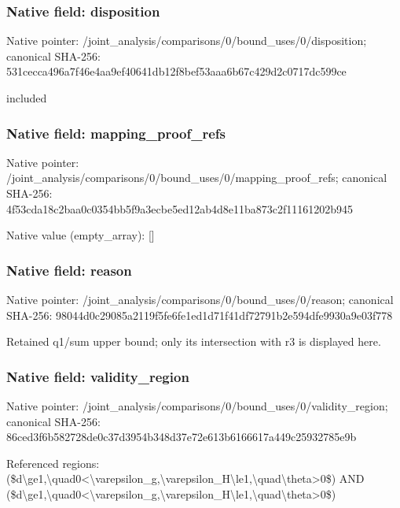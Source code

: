 \documentclass[10pt,a4paper]{article}
\begin{document}
\subsubsection{Native field: disposition}
Native pointer: /joint\_\allowbreak{}analysis/comparisons/0/bound\_\allowbreak{}uses/0/disposition; canonical SHA-256: 531cecca496a7f46e4aa9ef40641db12f8bef53aaa6b67c429d2c0717dc599ce

\begingroup\raggedright\sloppy included\par\endgroup

\subsubsection{Native field: mapping\_\allowbreak{}proof\_\allowbreak{}refs}
Native pointer: /joint\_\allowbreak{}analysis/comparisons/0/bound\_\allowbreak{}uses/0/mapping\_\allowbreak{}proof\_\allowbreak{}refs; canonical SHA-256: 4f53cda18c2baa0c0354bb5f9a3ecbe5ed12ab4d8e11ba873c2f11161202b945

Native value (empty\_\allowbreak{}array): []

\subsubsection{Native field: reason}
Native pointer: /joint\_\allowbreak{}analysis/comparisons/0/bound\_\allowbreak{}uses/0/reason; canonical SHA-256: 98044d0c29085a2119f5fe6fe1ed1d71f41df72791b2e594dfe9930a9e03f778

\begingroup\raggedright\sloppy Retained q1/\allowbreak{}sum upper bound;\allowbreak{} only its intersection with r3 is displayed here.\par\endgroup

\subsubsection{Native field: validity\_\allowbreak{}region}
Native pointer: /joint\_\allowbreak{}analysis/comparisons/0/bound\_\allowbreak{}uses/0/validity\_\allowbreak{}region; canonical SHA-256: 86ced3f6b582728de0c37d3954b348d37e72e613b6166617a449c25932785e9b

\begingroup\raggedright\sloppy Referenced regions:\allowbreak{} (\$d\textbackslash{}ge1,\allowbreak{}\textbackslash{}quad0<\textbackslash{}varepsilon\_\allowbreak{}g,\allowbreak{}\textbackslash{}varepsilon\_\allowbreak{}H\textbackslash{}le1,\allowbreak{}\textbackslash{}quad\textbackslash{}theta>0\$) AND (\$d\textbackslash{}ge1,\allowbreak{}\textbackslash{}quad0<\textbackslash{}varepsilon\_\allowbreak{}g,\allowbreak{}\textbackslash{}varepsilon\_\allowbreak{}H\textbackslash{}le1,\allowbreak{}\textbackslash{}quad\textbackslash{}theta>0\$)\par\endgroup
\end{document}
